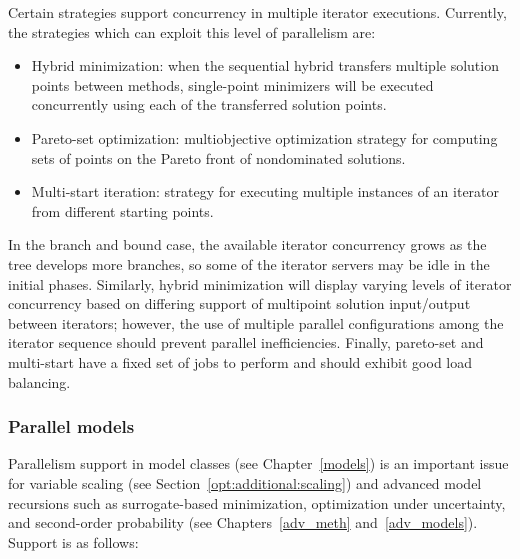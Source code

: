 Certain strategies support concurrency in multiple iterator
executions. Currently, the strategies which can exploit this level of
parallelism are:

\begin{itemize}
\item Hybrid minimization: when the sequential hybrid transfers multiple
solution points between methods, single-point minimizers will be executed
concurrently using each of the transferred solution points.


\item Pareto-set optimization: multiobjective optimization strategy for
computing sets of points on the Pareto front of nondominated solutions.

\item Multi-start iteration: strategy for executing multiple instances
of an iterator from different starting points.
\end{itemize}

In the branch and bound case, the available iterator concurrency grows
as the tree develops more branches, so some of the iterator servers
may be idle in the initial phases. Similarly, hybrid minimization will
display varying levels of iterator concurrency based on differing
support of multipoint solution input/output between iterators;
however, the use of multiple parallel configurations among the iterator
sequence should prevent parallel inefficiencies.  Finally, pareto-set
and multi-start have a fixed set of jobs to perform and should exhibit
good load balancing.

\subsubsection{Parallel models}\label{parallel:algorithms:models}

Parallelism support in model classes (see Chapter~\ref{models}) is an
important issue for variable scaling (see
Section~\ref{opt:additional:scaling}) and advanced model recursions
such as surrogate-based minimization, optimization under uncertainty,
and second-order probability (see Chapters~\ref{adv_meth}
and~\ref{adv_models}).  Support is as follows:

